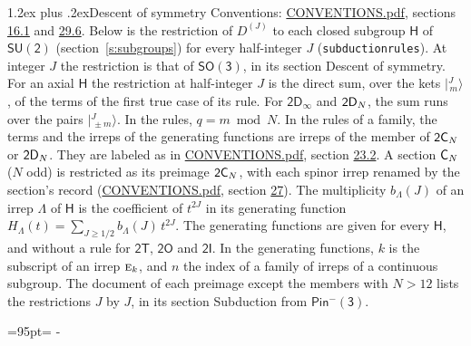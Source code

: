 \documentclass[10pt,a4paper]{article}
\makeatletter
\renewcommand\section{\@startsection{section}{1}{\z@}{-3ex plus -1ex minus -.2ex}%
  {1.2ex plus .2ex}{\normalfont\large\sffamily\bfseries\color{parttitle}}}
\newcommand{\needspace}[1]{\par\penalty-100\begingroup\dimen0=#1\relax\dimen2=\pagegoal
  \advance\dimen2-\pagetotal\ifdim\dimen0>\dimen2\relax\ifdim\dimen2>0pt\vfil\break\fi\fi
  \endgroup}
\numberwithin{equation}{section}
\newcommand{\grp}[1]{\mathsf{#1}}
\newcommand{\irr}[1]{\text{\normalfont\scshape #1}}
\newcommand{\irrJ}[1]{D^{(#1)}}
\newcommand{\jm}[2]{\bigl\lvert{}^{#1}_{\,#2}\bigr\rangle}
\makeatother
\begin{document}
\section{Descent of symmetry}\label{s:subduction}
Conventions: \href{../../CONVENTIONS.pdf}{CONVENTIONS.pdf}, sections \href{../../../rotation/CONVENTIONS.pdf\#conv.16.1}{16.1} and \href{../../CONVENTIONS.pdf\#conv.29.6}{29.6}.
\leavevmode\label{n:irrep.Gamma.subgroup}Below is the restriction of $\irrJ{J}$ to each closed subgroup $\grp{H}$ of $\grp{SU(2)}$ (section~\ref{s:subgroups}) for every half-integer $J$ (\texttt{subductionrules}). At integer $J$ the restriction is that of \href{../../../rotation/data/pdf/SO3.pdf}{$\grp{SO(3)}$}, in its section Descent of symmetry. For an axial $\grp{H}$ the restriction at half-integer $J$ is the direct sum, over the kets $\jm{J}{m}$, of the terms of the first true case of its rule. For \href{2Dinf.pdf}{$\grp{2D_{\infty }}$} and $\grp{2D_{\mathnormal{N}}}$, the sum runs over the pairs $\jm{J}{\pm m}$. \label{n:index.residue}In the rules, $q = m \bmod N$. In the rules of a family, the terms and the irreps of the generating functions are irreps of the member of $\grp{2C_{\mathnormal{N}}}$ or $\grp{2D_{\mathnormal{N}}}$. They are labeled as in \href{../../CONVENTIONS.pdf}{CONVENTIONS.pdf}, section \href{../../CONVENTIONS.pdf\#conv.23.2}{23.2}. A section $\grp{C_{\mathnormal{N}}}$ ($N$ odd) is restricted as its preimage $\grp{2C_{\mathnormal{N}}}$, with each spinor irrep renamed by the section's record (\href{../../CONVENTIONS.pdf}{CONVENTIONS.pdf}, section \href{../../CONVENTIONS.pdf\#conv.27}{27}). \label{n:function.multiplicity}\label{n:index.generating.variable}\label{n:function.generating}\label{n:function.generating.numerator}\label{n:irrep.Delta}The multiplicity $b_\Lambda(J)$ of an irrep $\Lambda$ of $\grp{H}$ is the coefficient of $t^{2J}$ in its generating function $H_\Lambda(t) = \sum_{J\ge1/2} b_\Lambda(J)\,t^{2J}$. The generating functions are given for every $\grp{H}$, and without a rule for \href{2T.pdf}{$\grp{2T}$}, \href{2O.pdf}{$\grp{2O}$} and \href{2I.pdf}{$\grp{2I}$}. In the generating functions, $k$ is the subscript of an irrep $\irr{e}_{k}$, and $n$ the index of a family of irreps of a continuous subgroup. The document of each preimage except the members with $N > 12$ lists the restrictions $J$ by $J$, in its section Subduction from \href{Pinminus3.pdf}{$\grp{Pin^{-}(3)}$}.
\needspace{95pt}
\end{document}
